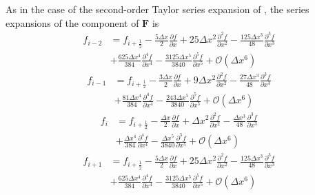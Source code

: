As in the case of the second-order Taylor series expansion of , the series expansions of the component of $\boldsymbol{F}$ is
\begin{equation}\label{eqn:fim2CD6}
	\begin{split}
		f_{i-2} &= f_{i+\frac{1}{2}} - \frac{5 \Delta x}{2} \frac{\partial f}{\partial x} + 25 \Delta x^2 \frac{\partial^2 f}{\partial x^2} - \frac{125 \Delta x^3}{48} \frac{\partial^3 f}{\partial x^3}\\ &+ \frac{625 \Delta x^4}{384} \frac{\partial^4 f}{\partial x^4} - \frac{3125 \Delta x^5}{3840} \frac{\partial^5 f}{\partial x^5} + \mathcal{O}\left(\Delta x^6\right)
	\end{split}
\end{equation}
\begin{equation}
	\begin{split}
		f_{i-1} &= f_{i+\frac{1}{2}} - \frac{3 \Delta x}{2} \frac{\partial f}{\partial x} + 9 \Delta x^2 \frac{\partial^2 f}{\partial x^2} - \frac{27 \Delta x^3}{48} \frac{\partial^3 f}{\partial x^3}\\ &+ \frac{81 \Delta x^4}{384} \frac{\partial^4 f}{\partial x^4} - \frac{243 \Delta x^5}{3840} \frac{\partial^5 f}{\partial x^5} + \mathcal{O}\left(\Delta x^6\right)
	\end{split}
\end{equation}
\begin{equation}
	\begin{split}
		f_{i} &= f_{i+\frac{1}{2}} - \frac{\Delta x}{2} \frac{\partial f}{\partial x} + \Delta x^2 \frac{\partial^2 f}{\partial x^2} - \frac{\Delta x^3}{48} \frac{\partial^3 f}{\partial x^3}\\ &+ \frac{\Delta x^4}{384} \frac{\partial^4 f}{\partial x^4} - \frac{\Delta x^5}{3840} \frac{\partial^5 f}{\partial x^5} + \mathcal{O}\left(\Delta x^6\right)
	\end{split}
\end{equation}
\begin{equation}
	\begin{split}
		f_{i+1} &= f_{i+\frac{1}{2}} - \frac{5 \Delta x}{2} \frac{\partial f}{\partial x} + 25 \Delta x^2 \frac{\partial^2 f}{\partial x^2} - \frac{125 \Delta x^3}{48} \frac{\partial^3 f}{\partial x^3}\\ &+ \frac{625 \Delta x^4}{384} \frac{\partial^4 f}{\partial x^4} - \frac{3125 \Delta x^5}{3840} \frac{\partial^5 f}{\partial x^5} + \mathcal{O}\left(\Delta x^6\right)
	\end{split}
\end{equation}
